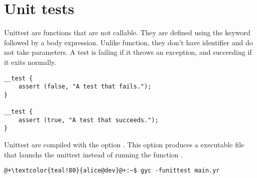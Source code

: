 \section{Unit tests}%
\label{sec:unit_test}

Unittest are functions that are not callable. They are defined using the keyword
 followed by a body expression. Unlike function, they don't
have identifier and do not take parameters. A test is failing if it throws an
exception, and succeeding if it exits normally.

\begin{lstlisting}[style=coloredverbatim]
__test {
    assert (false, "A test that fails.");
}

__test {
    assert (true, "A test that succeeds.");
}
\end{lstlisting}


Unittest are compiled with the option . This option produces
a executable file that launchs the unittest instead of running the function
.

\begin{lstlisting}[style=bashVerb, escapechar=@+]
@+\textcolor{teal!80}{alice@dev}@+:~$ gyc -funittest main.yr
\end{lstlisting}

\vfill%
\pagebreak
